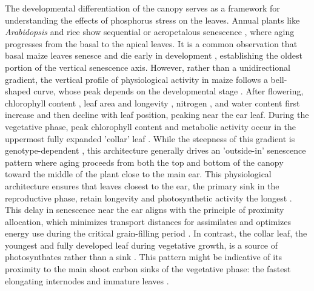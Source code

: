 \documentclass[9pt,twocolumn,twoside]{rilabRxiv}
\begin{document}
The developmental differentiation of the canopy serves as a framework for understanding the effects of phosphorus stress on the leaves. 
Annual plants like \textit{Arabidopsis} \cite{hensel1993} and rice \cite{mondal1984} show sequential or acropetalous senescence \cite{leopold1961}, where aging progresses from the basal to the apical leaves.
It is a common observation that basal maize leaves senesce and die early in development \cite{dudley1991}, establishing the oldest portion of the vertical senescence axis.
However, rather than a unidirectional gradient, the vertical profile of physiological activity in maize follows a bell-shaped curve, whose peak depends on the developmental stage \cite{ciganda2008}.
After flowering, chlorophyll content \cite{ciganda2008}, leaf area and longevity \cite{valentinuz2004}, nitrogen \cite{wei2025}, and water content \cite{gao2023a} first increase and then decline with leaf position, peaking near the ear leaf.
During the vegetative phase, peak chlorophyll content and metabolic activity occur in the uppermost fully expanded 'collar' leaf \cite{ciganda2008}.
While the steepness of this gradient is genotype-dependent \cite{gao2023a}, this architecture generally drives an 'outside-in' senescence pattern where aging proceeds from both the top and bottom of the canopy toward the middle \cite{wei2025} of the plant close to the main ear.
This physiological architecture ensures that leaves closest to the ear, the primary sink in the reproductive phase, retain longevity and photosynthetic activity the longest \cite{valentinuz2004}.
This delay in senescence near the ear aligns with the principle of proximity allocation, which minimizes transport distances for assimilates and optimizes energy use during the critical grain-filling period \cite{wei2025,valentinuz2004}.
In contrast, the collar leaf, the youngest and fully developed leaf during vegetative growth, is a source of photosynthates rather than a sink \cite{evert1996}. This pattern might be indicative of its proximity to the main shoot carbon sinks of the vegetative phase: the fastest elongating internodes and immature leaves \cite{zhao2022}.  
\end{document}
